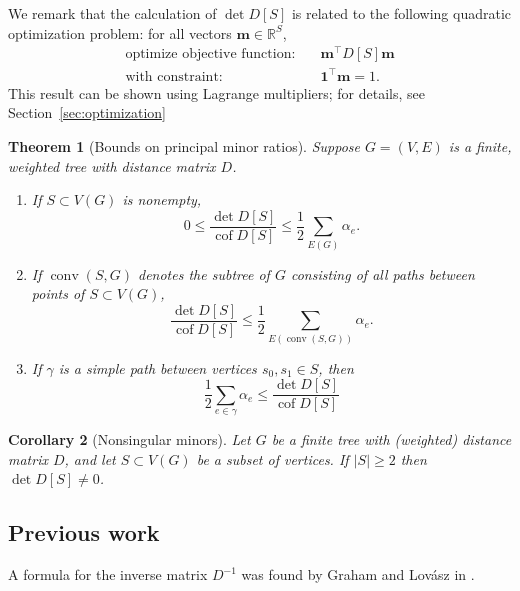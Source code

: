 \documentclass{amsart}
\newtheorem{thm}{Theorem}
\newtheorem{prop}[thm]{Proposition}
\newtheorem{cor}[thm]{Corollary}
\theoremstyle{definition}
\newcommand{\RR}{\mathbb{R}}
\newcommand{\bone}{\mathbf{1}}
\newcommand{\boldm}{\mathbf{m}}
\newcommand{\tr}{\intercal}
\DeclareMathOperator{\cof}{cof}
\DeclareMathOperator{\conv}{conv}
\begin{document}
We remark that the calculation of $\det D[S]$ is related to the following quadratic optimization problem: for all vectors $ \boldm \in \RR^S$,
\begin{align}
	\text{optimize objective function:} &\quad \boldm^\tr D[S] \boldm \\
	\text{with constraint:} &\quad \bone^\tr \boldm = 1.
\end{align}
This result can be shown using Lagrange multipliers; for details, see Section~\ref{sec:optimization}

\begin{thm}[Bounds on principal minor ratios]
Suppose $G = (V,E)$ is a finite, weighted tree with distance matrix $D$.
\begin{enumerate}
\item 
If $S \subset V(G)$ is nonempty,
\begin{equation*}
0 \leq \frac{\det D[S]}{\cof D[S]} \leq \frac12 \sum_{E(G)} \alpha_e .
\end{equation*}

\item 
If $\conv(S,G)$ denotes the subtree of $G$ consisting of all paths between points of $S \subset V(G)$,
\begin{equation*}
 \frac{\det D[S]}{\cof D[S]} \leq \frac12 \sum_{E(\conv(S, G))} \alpha_e .
\end{equation*}

\item 
If $\gamma$ is a simple path between vertices $s_0, s_1 \in S$, then
\begin{equation*}
	\frac12 \sum_{e \in \gamma} \alpha_e \leq \frac{\det D[S]}{\cof D[S]}
\end{equation*}
\end{enumerate}
\end{thm}

\begin{cor}[Nonsingular minors]
Let $G$ be a finite tree
with (weighted) distance matrix $D$,
and let $S \subset V(G)$ be a subset of vertices.
If $|S|\geq 2$ then $\det D[S] \neq 0$.
\end{cor}

\subsection{Previous work} 
A formula for the inverse matrix $D^{-1}$ was found by Graham and Lov\'{a}sz in \cite{graham-lovasz}.
\end{document}
